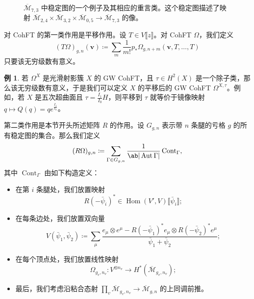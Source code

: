 \documentclass{amsart}
\theoremstyle{definition}
\newtheorem{exm}[thm]{例}
\theoremstyle{remark}
\theoremstyle{plain}
\theoremstyle{definition}
\theoremstyle{remark}
\newcommand{\Mbar}{\overline{\mathcal{M}}}
\newcommand{\mc}[1]{\mathcal{#1}}
\newcommand{\mbf}[1]{\mathbf{#1}}
\newcommand{\bv}{\mbf{v}}
\newcommand{\on}[1]{\operatorname{#1}}
\newcommand{\ol}[1]{\overline{#1}}
\newcommand{\1}{\mathbf{1}}
\newcommand{\2}{\mathbf{2}}
\newcommand{\3}{\mathbf{3}}
\newcommand{\ps}[1]{\llbracket #1 \rrbracket}
\DeclareMathOperator{\Hom}{Hom}
\DeclareMathOperator{\Aut}{Aut}
\begin{document}
\begin{figure}[htpb]
  \centering
  \caption{$\ol{\mc{M}}_{7,3}$ 中稳定图的一个例子及其相应的重言类。这个稳定图描述了映射
    $\ol{\mc{M}}_{2,4} \times \ol{\mc{M}}_{3,2} \times \ol{\mc{M}}_{0,5} \to \ol{\mc{M}}_{7,3}$ 的像。}
  \label{fig:stablegraph}
\end{figure}

对 CohFT 的第一类作用是平移作用。设 $T \in V\ps{z}$。对 CohFT $\Omega$，我们定义
\[ (T\Omega)_{g,n}(\bv) \coloneqq \sum_m \frac{1}{m!} p_* \Omega_{g,n+m}(\bv, T,\ldots,T) \]
只要该无穷级数有意义。

\begin{exm}
    若 $\Omega^X$ 是光滑射影簇 $X$ 的 GW CohFT，且 $\tau \in H^2(X)$ 是一个除子类，那么该无穷级数有意义，于是我们可以定义 $X$ 的平移后的 GW CohFT $\Omega^{X,\tau}$。例如，若 $X$ 是五次超曲面且 $\tau = \frac{I_1}{I_0} H$，则平移到 $\tau$ 就等价于镜像映射 $q \mapsto Q(q) = q e^{\frac{I_1}{I_0}}$。
\end{exm}

第二类作用是本节开头所述矩阵 $R$ 的作用。设 $G_{g,n}$ 表示带 $n$ 条腿的亏格 $g$ 的所有稳定图的集合。那么我们定义
\[ (R\Omega)_{g,n} \coloneqq \sum_{\Gamma \in G_{g,n}} \frac{1}{\ab|\Aut \Gamma|} \on{Cont}_{\Gamma}, \]
其中 $\on{Cont}_{\Gamma}$ 由如下构造定义：
\begin{itemize}
    \item 在第 $i$ 条腿处，我们放置映射
        \[ R(-\bar{\psi}_i)^* \in \Hom(V',V) \ps{\bar{\psi}_i}; \]
    \item 在每条边处，我们放置双向量
        \[ V(\bar{\psi}_1, \bar{\psi}_2) \coloneqq \sum_{\mu} \frac{e_{\mu} \otimes e^{\mu} - R(-\bar{\psi}_1)^* e_{\mu} \otimes R(-\bar{\psi}_2)^* e^{\mu}}{\bar{\psi}_1 + \bar{\psi}_2}; \]
    \item 在每个顶点处，我们放置线性映射
        \[ \Omega_{g_v, n_v} \colon V^{\otimes n_v} \to H^*(\Mbar_{g_v, n_v}); \]
    \item 最后，我们考虑沿粘合态射 $\prod_v \Mbar_{g_v, n_v} \to \Mbar_{g,n}$ 的上同调前推。
\end{itemize}
\end{document}
